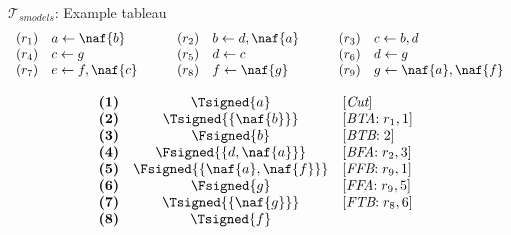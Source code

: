 \begin{frame}{$\mathcal{T}_{\textit{smodels}}$: Example tableau}
\small
\[
\begin{array}{llllllllllll}
(r_1)  &  a \leftarrow \naf{b}                  & & &
(r_2)  &  b \leftarrow d, \naf{a}               & & &
(r_3)  &  c \leftarrow b, d                            \\
(r_4)  &  c \leftarrow g                               & & &
(r_5)  &  d \leftarrow c                               & & &
(r_6)  &  d \leftarrow g                               \\
(r_7)  &  e \leftarrow f, \naf{c}               & & &
(r_8)  &  f \leftarrow \naf{g}                  & & &
(r_9)  &  g \leftarrow \naf{a}, \naf{f}
\end{array}
\]
\begin{center}
\hspace*{-15pt}
\begin{minipage}[t]{16cm}
\tiny
\begin{minipage}[t]{4.5cm}
\[
\hspace{-0.2cm}
\begin{array}{lcl}
\textbf{(1)}                                       &
  \Tsigned{a}                                      &
  [\textit{Cut}]                                   \\
\textbf{(2)}                                       &
  \Tsigned{\{\naf{b}\}}                     &
  [\textit{BTA}{:}\; r_1, \text{1}]                \\
\textbf{(3)}                                       &
  \Fsigned{b}                                      &
  [\textit{BTB}{:}\; \text{2}]                     \\
\textbf{(4)}                                       &
  \Fsigned{\{d,\naf{a}\}}                   &
  [\textit{BFA}{:}\;r_2, \text{3}]                 \\
\textbf{(5)}                                       &
  \Fsigned{\{\naf{a},\naf{f}\}}      &
  [\textit{FFB}{:}\;r_9, \text{1}]                 \\
\textbf{(6)}                                       &
  \Fsigned{g}                                      &
  [\textit{FFA}{:}\;r_9, \text{5}]                 \\
\textbf{(7)}                                       &
  \Tsigned{\{\naf{g}\}}                     &
  [\textit{FTB}{:}\;r_8, \text{6}]                 \\
\textbf{(8)}                                       &
  \Tsigned{f}                                      &

\end{array}\]
\end{minipage}
\end{minipage}
\end{center}
\end{frame}
